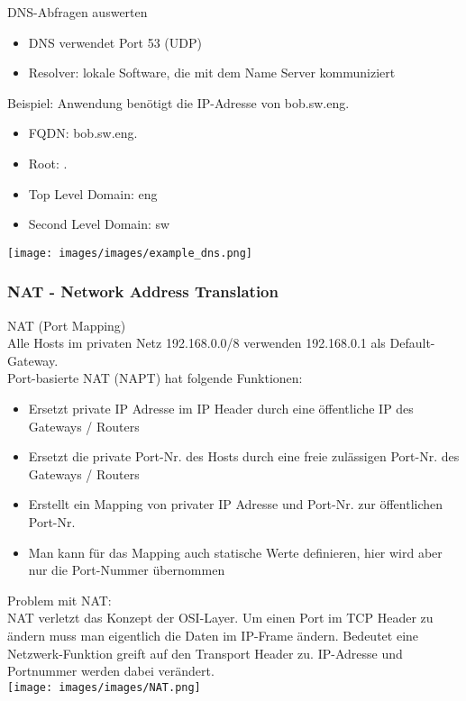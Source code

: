 \begin{example2}{DNS-Abfragen auswerten}
    \begin{itemize}
        \item DNS verwendet Port 53 (UDP)
        \item Resolver: lokale Software, die mit dem Name Server kommuniziert
    \end{itemize}
    Beispiel: Anwendung benötigt die IP-Adresse von bob.sw.eng.
    \begin{itemize}
        \item FQDN: bob.sw.eng. 
        \item Root: .
        \item Top Level Domain: eng
        \item Second Level Domain: sw
    \end{itemize}
        \texttt{[image: images/images/example\_dns.png]}        
\end{example2}

\columnbreak

\subsubsection{NAT - Network Address Translation}

\begin{definition}{NAT (Port Mapping)}\\
    Alle Hosts im privaten Netz 192.168.0.0/8 verwenden 192.168.0.1 als Default-Gateway.\\
    Port-basierte NAT (NAPT) hat folgende Funktionen:
    \begin{itemize}
        \item Ersetzt private IP Adresse im IP Header durch eine öffentliche IP des Gateways / Routers
        \item Ersetzt die private Port-Nr. des Hosts durch eine freie zulässigen Port-Nr. des Gateways / Routers
        \item Erstellt ein Mapping von privater IP Adresse und Port-Nr. zur öffentlichen Port-Nr.
        \item Man kann für das Mapping auch statische Werte definieren, hier wird aber nur die Port-Nummer übernommen
    \end{itemize}
    Problem mit NAT:\\
    NAT verletzt das Konzept der OSI-Layer. Um einen Port im TCP Header zu ändern muss man eigentlich die
    Daten im IP-Frame ändern. Bedeutet eine Netzwerk-Funktion greift auf den Transport Header zu.
    IP-Adresse und Portnummer werden dabei verändert. \\
        \texttt{[image: images/images/NAT.png]}
\end{definition}

